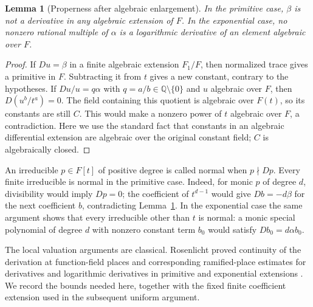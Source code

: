 \documentclass[11pt,a4paper]{article}
\newtheorem{lemma}[theorem]{Lemma}
\theoremstyle{definition}
\theoremstyle{remark}
\numberwithin{equation}{section}
\begin{document}
\begin{lemma}[Properness after algebraic enlargement]\label{stab:proper}
In the primitive case, $\beta$ is not a derivative in any algebraic
extension of $F$.  In the exponential case, no nonzero rational multiple
of $\alpha$ is a logarithmic derivative of an element algebraic over $F$.
\end{lemma}
\begin{proof}
If $Du=\beta$ in a finite algebraic extension $F_1/F$, then normalized
trace gives a primitive in $F$.  Subtracting it from $t$ gives a new
constant, contrary to the hypotheses.  If $Du/u=q\alpha$ with
$q=a/b\in\mathbb Q\setminus\{0\}$ and $u$ algebraic over $F$, then
$D(u^b/t^a)=0$.  The field containing this quotient is algebraic over
$F(t)$, so its constants are still $C$.  This would make a nonzero power
of $t$ algebraic over $F$, a contradiction.  Here we use the standard
fact that constants in an algebraic differential extension are
algebraic over the original constant field; $C$ is algebraically closed.
\end{proof}

An irreducible $p\in F[t]$ of positive degree is called normal when
$p\nmid Dp$.  Every finite irreducible is normal in the primitive case.
Indeed, for monic $p$ of degree $d$, divisibility would imply $Dp=0$;
the coefficient of $t^{d-1}$ would give $Db=-d\beta$ for the next
coefficient $b$, contradicting Lemma~\ref{stab:proper}.  In the
exponential case the same argument shows that every irreducible other
than $t$ is normal: a monic special polynomial of degree $d$ with
nonzero constant term $b_0$ would satisfy $Db_0=d\alpha b_0$.

The local valuation arguments are classical. Rosenlicht proved continuity
of the derivation at function-field places and corresponding ramified-place
estimates for derivatives and logarithmic derivatives in primitive and
exponential extensions \cite[Lemmas~1--2]{stab:Rosenlicht1969}.
We record the bounds needed here, together with the fixed finite
coefficient extension used in the subsequent uniform argument.
\end{document}
